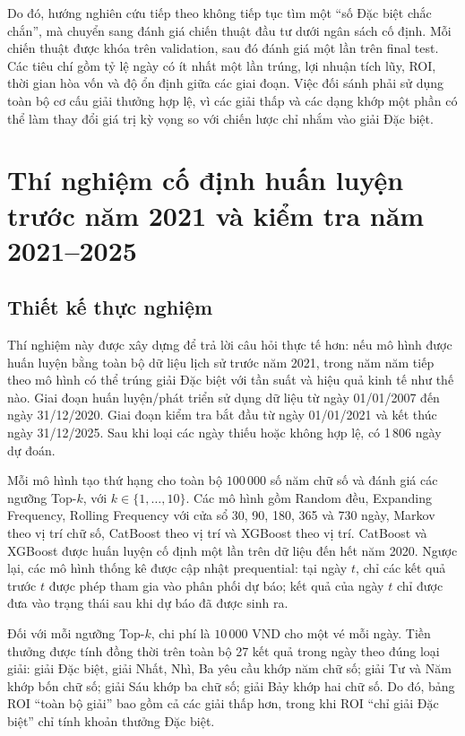 Do đó, hướng nghiên cứu tiếp theo không tiếp tục tìm một ``số Đặc biệt chắc chắn'', mà chuyển sang đánh giá chiến thuật đầu tư dưới ngân sách cố định. Mỗi chiến thuật được khóa trên validation, sau đó đánh giá một lần trên final test. Các tiêu chí gồm tỷ lệ ngày có ít nhất một lần trúng, lợi nhuận tích lũy, ROI, thời gian hòa vốn và độ ổn định giữa các giai đoạn. Việc đối sánh phải sử dụng toàn bộ cơ cấu giải thưởng hợp lệ, vì các giải thấp và các dạng khớp một phần có thể làm thay đổi giá trị kỳ vọng so với chiến lược chỉ nhắm vào giải Đặc biệt.

\section{Thí nghiệm cố định huấn luyện trước năm 2021 và kiểm tra năm 2021--2025}
\subsection{Thiết kế thực nghiệm}
Thí nghiệm này được xây dựng để trả lời câu hỏi thực tế hơn: nếu mô hình được huấn luyện bằng toàn bộ dữ liệu lịch sử trước năm 2021, trong năm năm tiếp theo mô hình có thể trúng giải Đặc biệt với tần suất và hiệu quả kinh tế như thế nào. Giai đoạn huấn luyện/phát triển sử dụng dữ liệu từ ngày 01/01/2007 đến ngày 31/12/2020. Giai đoạn kiểm tra bắt đầu từ ngày 01/01/2021 và kết thúc ngày 31/12/2025. Sau khi loại các ngày thiếu hoặc không hợp lệ, có 1\,806 ngày dự đoán.

Mỗi mô hình tạo thứ hạng cho toàn bộ $100\,000$ số năm chữ số và đánh giá các ngưỡng Top-$k$, với $k\in\{1,\ldots,10\}$. Các mô hình gồm Random đều, Expanding Frequency, Rolling Frequency với cửa sổ 30, 90, 180, 365 và 730 ngày, Markov theo vị trí chữ số, CatBoost theo vị trí và XGBoost theo vị trí. CatBoost và XGBoost được huấn luyện cố định một lần trên dữ liệu đến hết năm 2020. Ngược lại, các mô hình thống kê được cập nhật prequential: tại ngày $t$, chỉ các kết quả trước $t$ được phép tham gia vào phân phối dự báo; kết quả của ngày $t$ chỉ được đưa vào trạng thái sau khi dự báo đã được sinh ra.

Đối với mỗi ngưỡng Top-$k$, chi phí là $10\,000$ VND cho một vé mỗi ngày. Tiền thưởng được tính đồng thời trên toàn bộ 27 kết quả trong ngày theo đúng loại giải: giải Đặc biệt, giải Nhất, Nhì, Ba yêu cầu khớp năm chữ số; giải Tư và Năm khớp bốn chữ số; giải Sáu khớp ba chữ số; giải Bảy khớp hai chữ số. Do đó, bảng ROI ``toàn bộ giải'' bao gồm cả các giải thấp hơn, trong khi ROI ``chỉ giải Đặc biệt'' chỉ tính khoản thưởng Đặc biệt.

